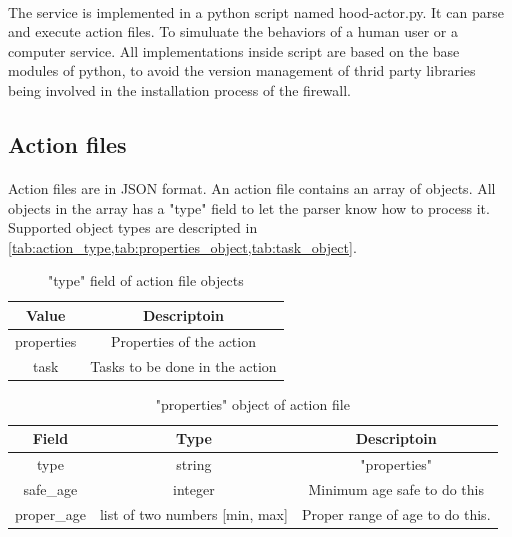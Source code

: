 \documentclass[mscthesis]{usiinfthesis}
\begin{document}
\paragraph{}
The service is implemented in a python script named hood-actor.py. It can parse and execute action files. To simuluate the behaviors of a human user or a computer service. All implementations inside script are based on the base modules of python, to avoid the version management of thrid party libraries being involved in the installation process of the firewall.

\subsection{Action files}
\paragraph{}
Action files are in JSON format. An action file contains an array of objects. All objects in the array has a "type" field to let the parser know how to process it. Supported object types are descripted in \cref{tab:action_type,tab:properties_object,tab:task_object}.

\begin{table}[H]
  \centering
  \begin{tabular}{|c|c|}
    \hline
    Value      & Descriptoin                    \\
    \hline
    properties & Properties of the action       \\
    task       & Tasks to be done in the action \\
    \hline
  \end{tabular}
  \caption{"type" field of action file objects}
  \label{tab:action_type}
\end{table}


\begin{table}[H]
  \centering
  \begin{tabular}{|c|c|c|}
    \hline
    Field       & Type                           & Descriptoin                     \\
    \hline
    type        & string                         & "properties"                    \\
    safe\_age   & integer                        & Minimum age safe to do this     \\
    proper\_age & list of two numbers [min, max] & Proper range of age to do this. \\
    \hline
  \end{tabular}
  \caption{"properties" object of action file}
  \label{tab:properties_object}
\end{table}
\end{document}
